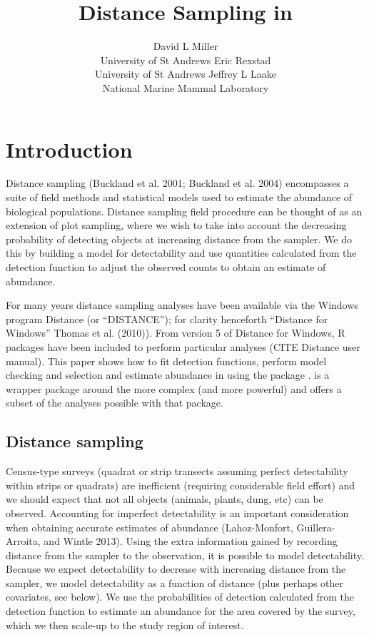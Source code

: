 \documentclass[article]{jss}
\author{
David L Miller\\University of St Andrews \And Eric Rexstad\\University of St Andrews \And Jeffrey L Laake\\National Marine Mammal Laboratory
}
\title{Distance Sampling in \proglang{R}}
\begin{document}
\section{Introduction}\label{introduction}

Distance sampling (Buckland et al. 2001; Buckland et al. 2004)
encompasses a suite of field methods and statistical models used to
estimate the abundance of biological populations. Distance sampling
field procedure can be thought of as an extension of plot sampling,
where we wish to take into account the decreasing probability of
detecting objects at increasing distance from the sampler. We do this by
building a model for detectability and use quantities calculated from
the detection function to adjust the observed counts to obtain an
estimate of abundance.

For many years distance sampling analyses have been available via the
Windows program Distance (or ``DISTANCE''); for clarity henceforth
``Distance for Windows'' Thomas et al. (2010)). From version 5 of
Distance for Windows, R packages have been included to perform
particular analyses (CITE Distance user manual). This paper shows how to
fit detection functions, perform model checking and selection and
estimate abundance in  using the package .
 is a wrapper package around the more complex (and more
powerful)  and offers a subset of the analyses possible with
that package.

\subsection{Distance sampling}\label{distance-sampling}

Census-type surveys (quadrat or strip transects assuming perfect
detectability within strips or quadrats) are inefficient (requiring
considerable field effort) and we should expect that not all objects
(animals, plants, dung, etc) can be observed. Accounting for imperfect
detectability is an important consideration when obtaining accurate
estimates of abundance (Lahoz-Monfort, Guillera-Arroita, and Wintle
2013). Using the extra information gained by recording distance from the
sampler to the observation, it is possible to model detectability.
Because we expect detectability to decrease with increasing distance
from the sampler, we model detectability as a function of distance (plus
perhaps other covariates, see below). We use the probabilities of
detection calculated from the detection function to estimate an
abundance for the area covered by the survey, which we then scale-up to
the study region of interest.
\end{document}

